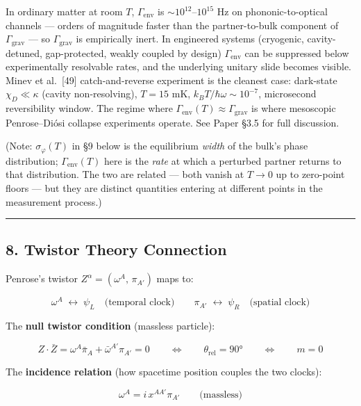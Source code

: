 \documentclass[
]{article}
\begin{document}
In ordinary matter at room \(T\), \(\Gamma_{\text{env}}\) is
\(\sim10^{12}\text{–}10^{15}\) Hz on phononic-to-optical channels ---
orders of magnitude faster than the partner-to-bulk component of
\(\Gamma_{\text{grav}}\) --- so \(\Gamma_{\text{grav}}\) is empirically
inert. In engineered systems (cryogenic, cavity-detuned, gap-protected,
weakly coupled by design) \(\Gamma_{\text{env}}\) can be suppressed
below experimentally resolvable rates, and the underlying unitary slide
becomes visible. Minev et al.~{[}49{]} catch-and-reverse experiment is
the cleanest case: dark-state \(\chi_D \ll \kappa\) (cavity
non-resolving), \(T = 15\) mK, \(k_BT/\hbar\omega \sim 10^{-7}\),
microsecond reversibility window. The regime where
\(\Gamma_{\text{env}}(T) \approx \Gamma_{\text{grav}}\) is where
mesoscopic Penrose--Diósi collapse experiments operate. See Paper §3.5
for full discussion.

(Note: \(\sigma_\varphi(T)\) in §9 below is the equilibrium \emph{width}
of the bulk's phase distribution; \(\Gamma_{\text{env}}(T)\) here is the
\emph{rate} at which a perturbed partner returns to that distribution.
The two are related --- both vanish at \(T \to 0\) up to zero-point
floors --- but they are distinct quantities entering at different points
in the measurement process.)

\begin{center}\rule{0.5\linewidth}{0.5pt}\end{center}

\subsection{8. Twistor Theory
Connection}\label{twistor-theory-connection}

Penrose's twistor \(Z^\alpha = (\omega^A,\, \pi_{A'})\) maps to:

\[\omega^A \;\longleftrightarrow\; \psi_L \quad \text{(temporal clock)} \qquad \pi_{A'} \;\longleftrightarrow\; \psi_R \quad \text{(spatial clock)}\]

The \textbf{null twistor condition} (massless particle):

\[Z \cdot \bar{Z} = \omega^A\bar{\pi}_A + \bar{\omega}^{A'}\pi_{A'} = 0 \qquad \Longleftrightarrow \qquad \theta_{\text{rel}} = 90° \qquad \Longleftrightarrow \qquad m = 0\]

The \textbf{incidence relation} (how spacetime position couples the two
clocks):

\[\omega^A = i\, x^{AA'}\pi_{A'} \qquad \text{(massless)}\]
\end{document}
